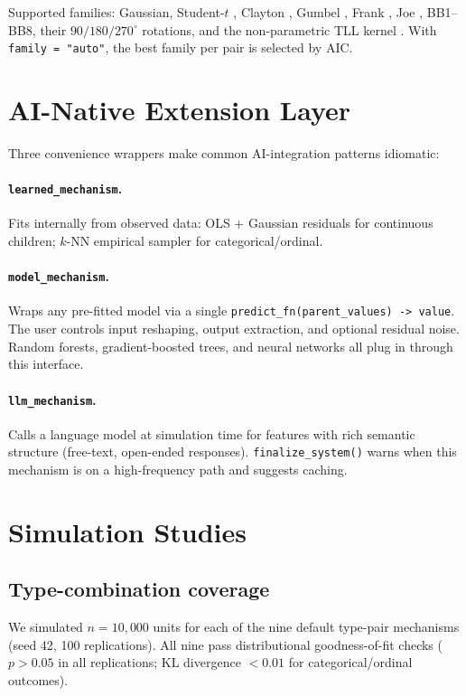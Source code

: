 \documentclass[12pt,a4paper]{article}
\newcommand{\code}[1]{\texttt{#1}}
\begin{document}
Supported families: Gaussian, Student-$t$ \citep{joe2014dependence}, Clayton \citep{clayton1978model}, Gumbel \citep{gumbel1960bivariate}, Frank \citep{frank1979}, Joe \citep{joe1993}, BB1--BB8, their $90/180/270^\circ$ rotations, and the non-parametric TLL kernel \citep{nagler2016evading}. With \code{family = "auto"}, the best family per pair is selected by AIC.

\section{AI-Native Extension Layer}
\label{sec:ai}

Three convenience wrappers make common AI-integration patterns idiomatic:

\paragraph{\code{learned\_mechanism}.} Fits internally from observed data: OLS + Gaussian residuals for continuous children; $k$-NN empirical sampler for categorical/ordinal.

\paragraph{\code{model\_mechanism}.} Wraps any pre-fitted model via a single \code{predict\_fn(parent\_values) -> value}. The user controls input reshaping, output extraction, and optional residual noise. Random forests, gradient-boosted trees, and neural networks all plug in through this interface.

\paragraph{\code{llm\_mechanism}.} Calls a language model at simulation time for features with rich semantic structure (free-text, open-ended responses). \code{finalize\_system()} warns when this mechanism is on a high-frequency path and suggests caching.

\section{Simulation Studies}
\label{sec:sims}

\subsection{Type-combination coverage}
We simulated $n=10{,}000$ units for each of the nine default type-pair mechanisms (seed 42, 100 replications). All nine pass distributional goodness-of-fit checks ($p > 0.05$ in all replications; KL divergence $<0.01$ for categorical/ordinal outcomes).
\end{document}
